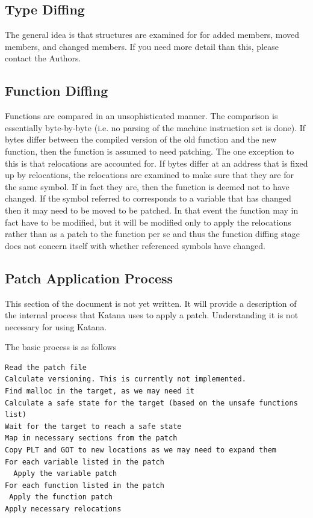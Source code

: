 \documentclass[11pt]{article}
\begin{document}
\subsection{Type Diffing}
\label{sec-3.11}

   The general idea is that structures are examined for for added
   members, moved members, and changed members. If you need more
   detail than this, please contact the Authors.
\subsection{Function Diffing}
\label{sec-3.12}

   Functions are compared in an unsophisticated manner. The comparison
   is essentially byte-by-byte (i.e. no parsing of the machine
   instruction set is done). If bytes differ between the compiled
   version of the old function and the new function, then the function
   is assumed to need patching.  The one exception to this is that
   relocations are accounted for. If bytes differ at an address that
   is fixed up by relocations, the relocations are examined to make
   sure that they are for the same symbol. If in fact they are, then
   the function is deemed not to have changed. If the symbol referred
   to corresponds to a variable that has changed then it may need to
   be moved to be patched. In that event the function may in fact have
   to be modified, but it will be modified only to apply the
   relocations rather than as a patch to the function per se and thus
   the function diffing stage does not concern itself with whether
   referenced symbols have changed.
\subsection{Patch Application Process}
\label{sec-3.13}

   This section of the document is not yet written. It will provide a
   description of the internal process that Katana uses to apply a
   patch. Understanding it is not necessary for using Katana.

   The basic process is as follows

\begin{verbatim}
Read the patch file
Calculate versioning. This is currently not implemented.
Find malloc in the target, as we may need it
Calculate a safe state for the target (based on the unsafe functions list)
Wait for the target to reach a safe state
Map in necessary sections from the patch
Copy PLT and GOT to new locations as we may need to expand them
For each variable listed in the patch
  Apply the variable patch
For each function listed in the patch
 Apply the function patch
Apply necessary relocations
\end{verbatim}
\end{document}
